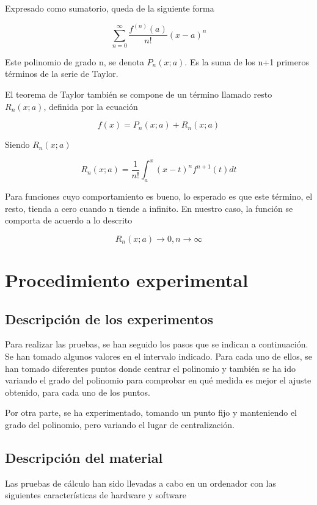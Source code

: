 \documentclass[a4paper,12pt]{report}
\begin{document}
Expresado como sumatorio, queda de la siguiente forma

\begin{displaymath}
\sum_{n=0}^\infty\frac{f^{(n)}(a)}{n!}(x-a)^{n}
\end{displaymath}

Este polinomio de grado n, se denota $P_n(x;a)$. Es la suma de los n+1 primeros términos de la serie de Taylor.

El teorema de Taylor también se compone de un término llamado resto $R_n(x;a)$, definida por la ecuación

\begin{displaymath}
f(x) = P_n(x;a) + R_n(x;a)
\end{displaymath}

Siendo $R_n(x;a)$

\begin{displaymath}
R_n(x;a) = \frac{1}{n!}\int_{a}^{x} (x-t)^nf^{n+1}(t)dt
\end{displaymath}

Para funciones cuyo comportamiento es bueno, lo esperado es que este término, el resto, tienda a cero cuando n tiende a infinito. En nuestro caso, 
la función se comporta de acuerdo a lo descrito

\begin{displaymath}
R_n(x;a)\rightarrow0 ,n\rightarrow\infty
\end{displaymath}


\chapter{Procedimiento experimental}
\section{Descripción de los experimentos}
Para realizar las pruebas, se han seguido los pasos que se indican a continuación. Se han tomado algunos valores en el intervalo
indicado. Para cada uno de ellos, se han tomado diferentes puntos donde centrar el polinomio y también se ha ido variando el 
grado del polinomio para comprobar en qué medida es mejor el ajuste obtenido, para cada uno de los puntos.

Por otra parte, se ha experimentado, tomando un punto fijo y manteniendo el grado del polinomio, pero variando el lugar de
centralización.
\section{Descripción del material}
Las pruebas de cálculo han sido llevadas a cabo en un ordenador con las siguientes características de hardware y software
\end{document}
